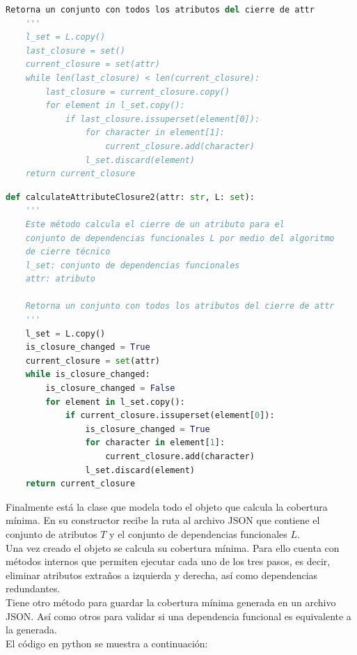 \documentclass[a4paper,12pt]{article}
\begin{document}
{\begin{lstlisting}[language=python, caption={Algoritmo que calcula el cierre de una atributo guardando su estado anterior.\\\hspace{\textwidth}}, captionpos=t]
    Retorna un conjunto con todos los atributos del cierre de attr
    '''
    l_set = L.copy()
    last_closure = set()
    current_closure = set(attr)
    while len(last_closure) < len(current_closure):
        last_closure = current_closure.copy()
        for element in l_set.copy():
            if last_closure.issuperset(element[0]):
                for character in element[1]:
                    current_closure.add(character)
                l_set.discard(element)
    return current_closure
\end{lstlisting}

\begin{lstlisting}[language=python, caption={Algoritmo que calcula el cierre de una atributo utilizando una variable bool.\\\hspace{\textwidth}}, captionpos=t]
def calculateAttributeClosure2(attr: str, L: set):
    '''
    Este método calcula el cierre de un atributo para el
    conjunto de dependencias funcionales L por medio del algoritmo
    de cierre técnico
    l_set: conjunto de dependencias funcionales
    attr: atributo

    Retorna un conjunto con todos los atributos del cierre de attr
    '''
    l_set = L.copy()
    is_closure_changed = True
    current_closure = set(attr)
    while is_closure_changed:
        is_closure_changed = False
        for element in l_set.copy():
            if current_closure.issuperset(element[0]):
                is_closure_changed = True
                for character in element[1]:
                    current_closure.add(character)
                l_set.discard(element)
    return current_closure

\end{lstlisting}

Finalmente está la clase que modela todo el objeto que calcula la cobertura mínima. En su constructor recibe la ruta al archivo JSON que contiene el conjunto de atributos $T$ y el conjunto de dependencias funcionales $L$.
\\
Una vez creado el objeto se calcula su cobertura mínima. Para ello cuenta con métodos internos que permiten ejecutar cada uno de los tres pasos, es decir, eliminar atributos extraños a izquierda y derecha, así como dependencias redundantes.
\\
Tiene otro método para guardar la cobertura mínima generada en un archivo JSON. Así como otros para validar si una dependencia funcional es equivalente a la generada.
\\
El código en python se muestra a continuación:


}
\end{document}
